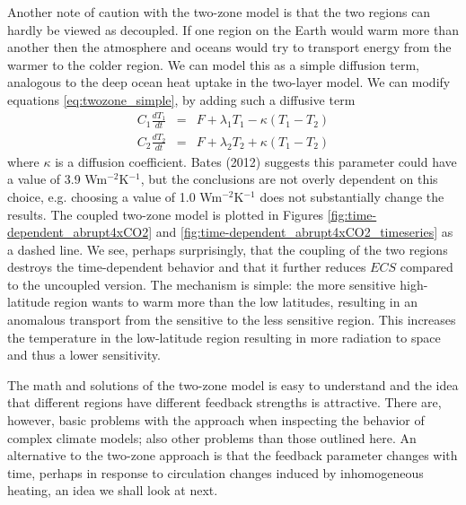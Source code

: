 \documentclass[12pt]{book}
\begin{document}
Another note of caution with the two-zone model is that the two regions can hardly be viewed as decoupled. If one region on the Earth would warm more than another then the atmosphere and oceans would try to transport energy from the warmer to the colder region. We can model this as a simple diffusion term, analogous  to the deep ocean heat uptake in the two-layer model. We can modify equations \ref{eq:twozone_simple}, by adding such a diffusive term
\begin{eqnarray}
C_1\frac{dT_1}{dt} &=& F + \lambda_1 T_1 - \kappa(T_1-T_2) \label{eq:twozone_coupled} \\
C_2\frac{dT_2}{dt} &=& F + \lambda_2 T_2 + \kappa(T_1-T_2) \nonumber 
\end{eqnarray}
 where $\kappa$ is a diffusion coefficient. Bates (2012) suggests this parameter could have a value of 3.9 Wm$^{-2}$K$^{-1}$, but the conclusions are not overly dependent on this choice, e.g. choosing a value of 1.0 Wm$^{-2}$K$^{-1}$ does not substantially change the results. The coupled two-zone model is plotted in Figures \ref{fig:time-dependent_abrupt4xCO2} and \ref{fig:time-dependent_abrupt4xCO2_timeseries} as a dashed line. We see, perhaps surprisingly, that the coupling of the two regions destroys the time-dependent behavior and that it further reduces $ECS$ compared to the uncoupled version. The mechanism is simple: the more sensitive high-latitude region wants to warm more than the low latitudes, resulting in an anomalous transport from the sensitive to the less sensitive region. This increases the temperature in the low-latitude region resulting in more radiation to space and thus a lower sensitivity.


The math and solutions of the two-zone model is easy to understand and the idea that different regions have different feedback strengths is attractive. 
There are, however, basic problems with the approach when inspecting the behavior of complex climate models; also other problems than those outlined here.
An alternative to the two-zone approach is that the feedback parameter changes with time, perhaps in response to circulation changes induced by inhomogeneous heating, an idea we shall look at next.

\end{document}

